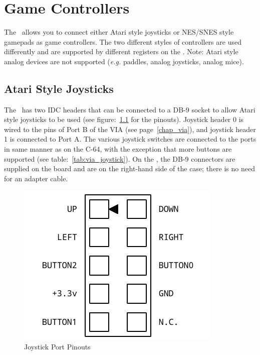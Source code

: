 \chapter{Game Controllers}

The \jr\ allows you to connect either Atari style joysticks or NES/SNES style gamepads as game controllers. The two different styles of controllers are used differently and are supported by different registers on the \jr. Note: Atari style analog devices are not supported ({\it e.g.} paddles, analog joysticks, analog mice).

\section*{Atari Style Joysticks}

The \fjr\ has two IDC headers that can be connected to a DB-9 socket to allow Atari style joysticks to be used (see figure:~\ref{fig:joystick_ports} for the pinouts). Joystick header 0 is wired to the pins of Port B of the VIA (see page~\ref{chap_via}), and joystick header 1 is connected to Port A. The various joystick switches are connected to the ports in same manner as on the C-64, with the exception that more buttons are supported (see table:~\ref{tab:via_joystick}). On the \fk, the DB-9 connectors are supplied on the board and are on the right-hand side of the case; there is no need for an adapter cable.

\begin{figure}[ht]
    \begin{center}
        \includegraphics[scale=0.65]{images/f256_port_joystick.pdf}
    \end{center}
    \caption{Joystick Port Pinouts}
    \label{fig:joystick_ports}
\end{figure}

